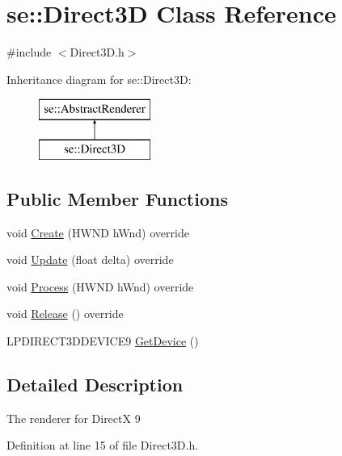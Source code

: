 \hypertarget{classse_1_1_direct3_d}{}\section{se\+:\+:Direct3D Class Reference}
\label{classse_1_1_direct3_d}


{\ttfamily \#include $<$Direct3\+D.\+h$>$}

Inheritance diagram for se\+:\+:Direct3D\+:\begin{figure}[H]
\begin{center}
\leavevmode
\includegraphics[height=2.000000cm]{classse_1_1_direct3_d}
\end{center}
\end{figure}
\subsection*{Public Member Functions}
\begin{DoxyCompactItemize}
\item 
void \mbox{\hyperlink{classse_1_1_direct3_d_a316456762829db0614077cccd655e654}{Create}} (H\+W\+ND h\+Wnd) override
\item 
void \mbox{\hyperlink{classse_1_1_direct3_d_a39934c194406f108a992d82a4d265381}{Update}} (float delta) override
\item 
void \mbox{\hyperlink{classse_1_1_direct3_d_a64e4eb2d2516261468e2e23c92dec1b4}{Process}} (H\+W\+ND h\+Wnd) override
\item 
void \mbox{\hyperlink{classse_1_1_direct3_d_ae2979f16a5c35773cf2c243d8e6f90e4}{Release}} () override
\item 
L\+P\+D\+I\+R\+E\+C\+T3\+D\+D\+E\+V\+I\+C\+E9 \mbox{\hyperlink{classse_1_1_direct3_d_a0735c84f0cdd65088702b03c4ed7c7b7}{Get\+Device}} ()
\end{DoxyCompactItemize}


\subsection{Detailed Description}
The renderer for DirectX 9 

Definition at line 15 of file Direct3\+D.\+h.



